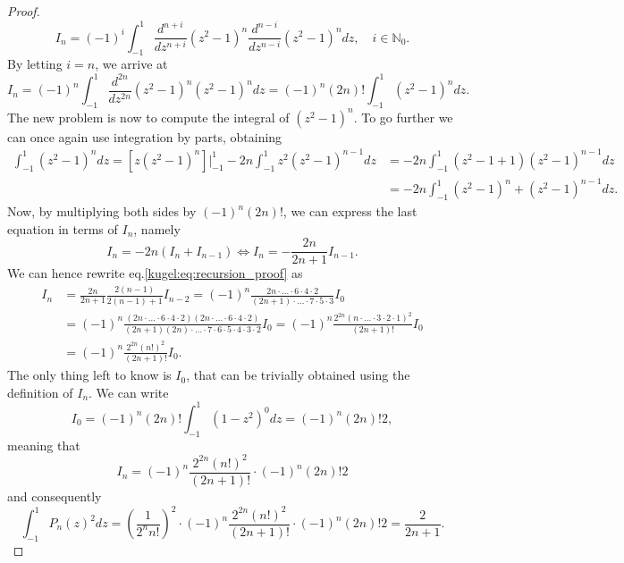 \begin{proof}
  \begin{equation*}
    I_n = (-1)^i \int_{-1}^1 \frac{d^{n+i}}{dz^{n+i}} (z^2-1)^n \frac{d^{n-i}}{dz^{n-i}} (z^2-1)^n dz, \quad i \in \mathbb{N}_0.
  \end{equation*}
  By letting $i=n$, we arrive at
  \begin{equation*}
    I_n = (-1)^n \int_{-1}^1 \frac{d^{2n}}{dz^{2n}} (z^2-1)^n (z^2-1)^n dz = (-1)^n (2n)! \int_{-1}^1 (z^2-1)^n dz.
  \end{equation*}
  The new problem is now to compute the integral of $(z^2-1)^n$. To go further we can once again use integration by parts, obtaining
  \begin{align*}
    \int_{-1}^1 (z^2-1)^n dz =  \left[
       z(z^2-1)^n
      \right] \Bigg|_{-1}^1 -2n \int_{-1}^1 z^2 (z^2-1)^{n-1} dz 
      &= -2n \int_{-1}^1 (z^2-1+1) (z^2-1)^{n-1} dz \\
      &= -2n \int_{-1}^1 (z^2-1)^n + (z^2-1)^{n-1} dz.
  \end{align*}
  Now, by multiplying both sides by $(-1)^n(2n)!$, we can express the last equation in terms of $I_n$, namely
  \begin{equation}
    I_n = -2n ( I_n + I_{n-1} ) \iff I_n = -\frac{2n}{2n+1} I_{n-1}. \label{kugel:eq:recursion_proof}
  \end{equation}
  We can hence rewrite eq.\eqref{kugel:eq:recursion_proof} as
  \begin{align*}
    I_n &= \frac{2n}{2n+1} \frac{2(n-1)}{2(n-1)+1} I_{n-2} = (-1)^n \frac{2n \cdot \hdots \cdot 6\cdot 4\cdot 2}{(2n+1) \cdot \hdots \cdot 7 \cdot 5 \cdot 3} I_0 \\
        &= (-1)^n \frac{(2n \cdot \hdots \cdot 6\cdot 4\cdot 2)(2n \cdot \hdots \cdot 6\cdot 4\cdot 2)}
                       {(2n+1)(2n)\cdot \hdots \cdot 7\cdot 6\cdot 5\cdot 4\cdot 3\cdot 2} I_0 = (-1)^n \frac{2^{2n}(n\cdot \hdots \cdot 3 \cdot 2 \cdot 1)^2}
                                                                                                             {(2n+1)!} I_0 \\
    &= (-1)^n  \frac{2^{2n}(n!)^2}{(2n+1)!} I_0 .
  \end{align*}
  The only thing left to know is $I_0$, that can be trivially obtained using the definition of $I_n$. We can write
  \begin{equation*}
    I_0 = (-1)^n(2n)! \int_{-1}^1 (1-z^2)^0 dz = (-1)^n(2n)! 2,
  \end{equation*}
  meaning that
  \begin{equation*}
    I_n = (-1)^n  \frac{2^{2n}(n!)^2}{(2n+1)!} \cdot (-1)^n(2n)! 2
  \end{equation*}
  and consequently
  \begin{equation*}
      \int_{-1}^1 P_n(z)^2 dz = \left( \frac{1}{2^n n!} \right)^2 \cdot (-1)^n  \frac{2^{2n}(n!)^2}{(2n+1)!} \cdot (-1)^n(2n)! 2 = \frac{2}{2n+1}.
  \end{equation*}

\end{proof}

